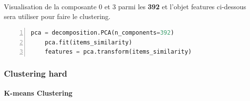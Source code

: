 \begin{figure}[H]
    \centering
    \qquad
\end{figure}

Visualisation de la composante 0 et 3 parmi les \textbf{392} et l’objet \colorbox{gray!30}{features} ci-dessous sera utiliser pour faire le clustering.
\begin{lstlisting}[language=Python,label={pca_code}, basicstyle=\scriptsize, frame=l,framesep=4.5mm,framexleftmargin=2.5mm,tabsize=2,numbers=left,fillcolor=\color{blueforest!70},rulecolor=\color{blueforest},numberstyle=\normalfont\tiny\color{white}]
	pca = decomposition.PCA(n_components=392)
	pca.fit(items_similarity)
	features = pca.transform(items_similarity)
\end{lstlisting}

\subsubsection{Clustering hard}

\paragraph{K-means Clustering}


